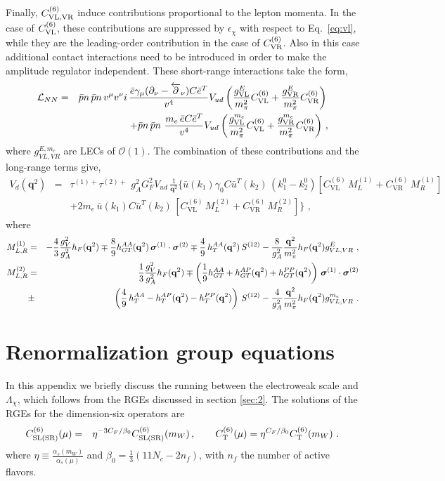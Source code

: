 \documentclass[letterpaper,11pt]{article}
\newcommand{\al}{\alpha}
\newcommand{\bt}{\beta}
\newcommand{\g}{\gamma}
\newcommand{\vL}{\ensuremath{\mathcal{L}}}
\newcommand{\bea}{\begin{eqnarray}}
\newcommand{\eea}{\end{eqnarray}}
\newcommand{\boldsigma}{\mbox{\boldmath $\sigma$}}
\renewcommand{\vec}[1]{{\mathbf #1}}
\newcommand{\Or}{\mathcal O}
\newcommand{\sq}{^{2}}
\newcommand{\nn}{\nonumber}
\begin{document}
Finally, $C^{(6)}_{\rm VL, VR}$ induce contributions proportional to the lepton momenta. In the case of $C^{(6)}_{\rm VL}$, these contributions are suppressed by $\epsilon_\chi$ with respect to Eq.\ \eqref{eq:vl}, while they are the leading-order contribution in the case of $C^{(6)}_{\rm VR}$.
Also in this case additional contact interactions need to be introduced in order to make the amplitude regulator independent. These short-range interactions take the form,
\bea
\vL_{NN} &=&   \bar p    n\, \bar p   n \,v^\mu v^\nu i  \, \frac{\bar e \g_\mu (\partial_\nu -\overleftarrow\partial_\nu) C\bar e^T}{v^4} 
V_{ud}\left(   \frac{g^{E}_{\rm VL}}{m_\pi\sq} C^{(6)}_{\rm VL} 
+\frac{g^{E}_{\rm VR}}{m_\pi\sq} C^{(6)}_{\rm VR} \right)\,\nn\\
&&+  \bar p    n\, \bar p   n \,\, \frac{m_e \,\bar e C\bar e^T}{v^4} 
V_{ud} \left(   \frac{g^{m_e}_{\rm VL}}{m_\pi\sq} C^{(6)}_{\rm VL} 
+\frac{g^{m_e}_{\rm VR}}{m_\pi\sq} C^{(6)}_{\rm VR} \right)\,,
\eea
where $g_{VL,VR}^{E,m_e}$ are LECs of $\Or(1)$.
The combination of these contributions and the long-range terms give,
\bea\label{eq:vlvr}
V_d(\vec q^2) &=&  
\tau^{(1) +} \tau^{(2) + } \,  \,  g_A\sq G_F^2V_{ud} \,   \frac{1}{\vec q\sq} \Bigg\{  \bar u(k_1)  \gamma_0  C\bar u^T(k_2) \, (k_1^0 - k_2^0) \left[C^{(6)}_{\textrm{VL}}\, M^{(1)}_L+C^{(6)}_{\textrm{VR}}\, M^{(1)}_R\right] \nn \\
&& +2 m_e \, \bar u(k_1) C   \bar u^T(k_2) \, \left[C^{(6)}_{\textrm{VL}}\, M^{(2)}_L+C^{(6)}_{\textrm{VR}}\, M^{(2)}_R\right]
\Bigg\}\,\,,
\eea
where
\bea
M_{L,R}^{(1)} &=& - \frac{4}{3} \frac{g_V\sq }{g_A\sq}h_F(\vec q\sq)\mp \frac{8}{9} h_{GT}^{AA}(\vec q^2)\,  \boldsigma^{(1)} \cdot \boldsigma^{(2)}  \mp \frac{4}{9}\, h_{T}^{AA}(\vec q^2) \, S^{(12)}-\frac{8}{g_A\sq }\frac{\vec q\sq}{m_\pi\sq}h_F(\vec q\sq) g_{VL,VR}^{E}
\,\,,\nn\\
M_{L,R}^{(2)} &=&   \frac{1}{3} \frac{g_V\sq }{g_A\sq}h_F(\vec q\sq)\mp \left(\frac{1}{9}  h_{GT}^{AA}+h_{GT}^{AP}(\vec q^2)+h_{GT}^{PP}(\vec q^2)\right)\,  \boldsigma^{(1)} \cdot \boldsigma^{(2)}\nn\\  &\pm& \left(\frac{4}{9}\,  h_{T}^{AA}-h_{T}^{AP}(\vec q^2)-h_{T}^{PP}(\vec q^2)\right) \, S^{(12)}-\frac{4}{g_A\sq }\frac{\vec q\sq}{m_\pi\sq}h_F(\vec q\sq) g_{VL,VR}^{m_e}\,\,.
\eea


 


\section{Renormalization group equations}\label{App:RG}
In this appendix we briefly discuss the running between the electroweak scale and $\Lambda_\chi$, which follows from the RGEs  discussed in section \ref{sec:2}. The solutions of the RGEs for the  dimension-six operators are 
\bea
C_{\rm SL(SR)}^{(6)}(\mu) &=& \eta^{-3 C_F/\bt_0}C_{\rm SL(SR)}^{(6)}(m_W)\,,\qquad C_{\rm T}^{(6)}(\mu)=\eta^{C_F/\bt_0}C_{\rm T}^{(6)}(m_W)\,\,.\nn
\eea
where $\eta\equiv \frac{\al_s(m_W)}{\al_s(\mu)}$ and $\bt_0=\frac{1}{3}(11 N_c-2n_f)$, with $n_f$ the number of active flavors.
\end{document}
